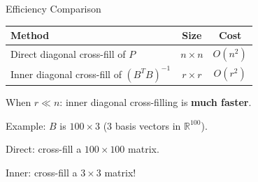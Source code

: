 \documentclass[10pt]{beamer}
\theoremstyle{definition}
\newcommand{\x}[1]{\alert{\textbf{#1}}}
\begin{document}
\begin{frame}{Efficiency Comparison}

\begin{center}
{\small\begin{tabular}{lcc}
\textbf{Method} & \textbf{Size} & \textbf{Cost} \\
\hline
Direct diagonal cross-fill of $P$ & $n \times n$ & $O(n^2)$ \\
Inner diagonal cross-fill of $(B^TB)^{-1}$ & $r \times r$ & $O(r^2)$ \\
\end{tabular}}
\end{center}

\vspace{0.5em}

When $r \ll n$: inner diagonal cross-filling is \x{much faster}.

\vspace{0.5em}

Example: $B$ is $100 \times 3$ (3 basis vectors in $\mathbb{R}^{100}$).

\vspace{0.3em}

Direct: cross-fill a $100 \times 100$ matrix.

Inner: cross-fill a $3 \times 3$ matrix!

\end{frame}
\end{document}
